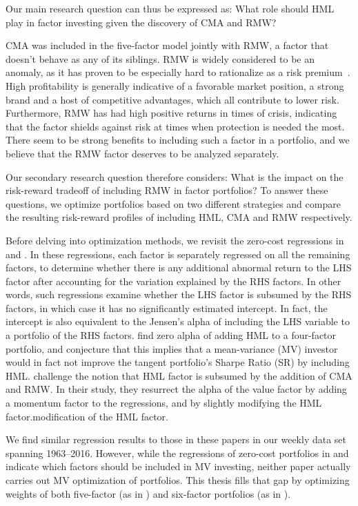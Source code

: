 Our main research question can thus be expressed as: What role should HML play in factor investing given the discovery of CMA and RMW?

CMA was included in the five-factor model jointly with RMW, a factor that doesn't behave as any of its siblings. RMW is widely considered to be an anomaly, as it has proven to be especially hard to rationalize as a risk premium~\autocite{Wang2013}. High profitability is generally indicative of a favorable market position, a strong brand and a host of competitive advantages, which all contribute to lower risk. Furthermore, RMW has had high positive returns in times of crisis, indicating that the factor shields against risk at times when protection is needed the most. There seem to be strong benefits to including such a factor in a portfolio, and we believe that the RMW factor deserves to be analyzed separately.

Our secondary research question therefore considers: What is the impact on the risk-reward tradeoff of including RMW in factor portfolios? To answer these questions, we optimize portfolios based on two different strategies and compare the resulting risk-reward profiles of including HML, CMA and RMW respectively.

Before delving into optimization methods, we revisit the zero-cost regressions in \textcite{FF2015} and \textcite{Asness2015}. In these regressions, each factor is separately regressed on all the remaining factors, to determine whether there is any additional abnormal return to the LHS factor after accounting for the variation explained by the RHS factors. In other words, such regressions examine whether the LHS factor is subsumed by the RHS factors, in which case it has no significantly estimated intercept. In fact, the intercept is also equivalent to the Jensen's alpha of including the LHS variable to a portfolio of the RHS factors. \textcite{FF2015} find zero alpha of adding HML to a four-factor portfolio, and conjecture that this implies that a mean-variance (MV) investor would in fact not improve the tangent portfolio's Sharpe Ratio (SR) by including HML. \textcite{Asness2015} challenge the notion that HML factor is subsumed by the addition of CMA and RMW. In their study, they resurrect the alpha of the value factor by adding a momentum factor to the regressions, and by slightly modifying the HML factor.modification of the HML factor. 

We find similar regression results to those in these papers in our weekly data set spanning 1963--2016. However, while the regressions of zero-cost portfolios in \textcite{FF2015} and \textcite{Asness2015} indicate which factors should be included in MV investing, neither paper actually carries out MV optimization of portfolios. This thesis fills that gap by optimizing weights of both five-factor (as in \textcite{FF2015}) and six-factor portfolios (as in \textcite{Asness2015}). 

